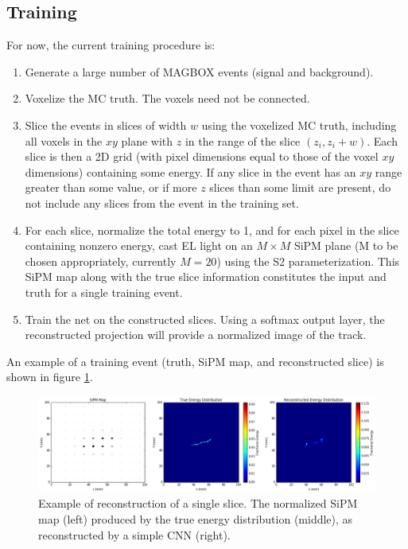 \subsection{Training}
For now, the current training procedure is:

\begin{enumerate}
	\item[1.] Generate a large number of MAGBOX events (signal and background).
	\item[2.] Voxelize the MC truth.  The voxels need not be connected.
	\item[3.] Slice the events in slices of width $w$ using the voxelized MC truth, including all voxels in the $xy$ plane with $z$ in the range of the slice $(z_i, z_i + w)$.  Each slice is then a 2D grid (with pixel dimensions equal to those of the voxel $xy$ dimensions) containing some energy.  If any slice in the event has an $xy$ range greater than some value, or if more $z$ slices than some limit are present, do not include any slices from the event in the training set.
	\item[4.] For each slice, normalize the total energy to 1, and for each pixel in the slice containing nonzero energy, cast EL light on an $M \times M$ SiPM plane (M to be chosen appropriately, currently $M = 20$) using the S2 parameterization.  This SiPM map along with the true slice information constitutes the input and truth for a single training event.
	\item[5.] Train the net on the constructed slices.  Using a softmax output layer, the reconstructed projection will provide a normalized image of the track.
\end{enumerate}

\noindent An example of a training event (truth, SiPM map, and reconstructed slice) is shown in figure \ref{fig:slice_train}.

\begin{figure}[!htb]
	\centering
	\includegraphics[scale=0.41]{fig/reconst_example_evt1.png}
	\caption{\label{fig:slice_train}Example of reconstruction of a single slice. The normalized SiPM map (left) produced by the true energy distribution (middle), as reconstructed by a simple CNN (right).}
\end{figure}